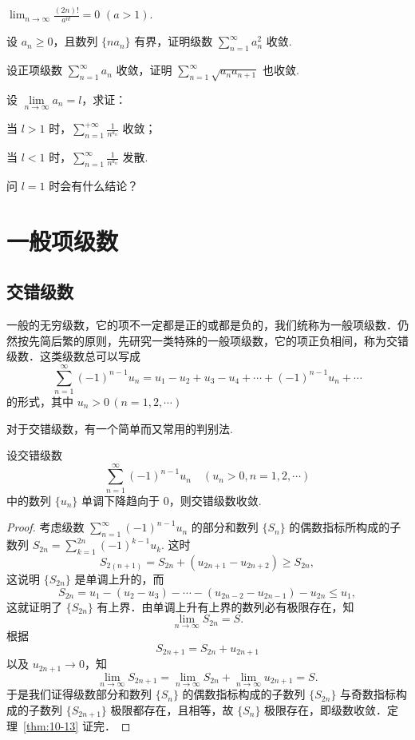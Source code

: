 \begin{xiti}
\begin{ziti}
\item $\displaystyle\lim_{n\to\infty}\frac{(2n)!}{a^{n!}}=0$ $(a>1)$.
\end{ziti}
\item 设 $a_n\geq0$，且数列 $\{na_n\}$ 有界，证明级数 $\displaystyle\sum_{n=1}^{\infty}a_n^2$ 收敛.
\item 设正项级数 $\displaystyle\sum_{n=1}^{\infty}a_{n}$ 收敛，证明 $\sum_{n=1}^{\infty}\sqrt{a_{n}a_{n+1}}$ 也收敛.
\item 设 $\lim\limits_{n\to\infty}a_n=l$，求证：
\begin{ziti}
\item 当 $l>1$ 时，$\displaystyle\sum_{n=1}^{+\infty}\frac{1}{n^{a_{n}}}$ 收敛；
\item 当 $l<1$ 时，$\displaystyle\sum_{n=1}^{\infty}\frac{1}{n^{a_{n}}}$ 发散.
\end{ziti}
问 $l=1$ 时会有什么结论？
\end{xiti}

\section{一般项级数}

\subsection{交错级数}

一般的无穷级数，它的项不一定都是正的或都是负的，我们统称为一般项级数．仍然按先简后繁的原则，先研究一类特殊的一般项级数，它的项正负相间，称为交错级数．这类级数总可以写成
\[
\sum_{n=1}^{\infty}(-1)^{n-1}u_{n}=u_{1}-u_{2}+u_{3}-u_{4}+\cdots+(-1)^{n-1}u_{n}+\cdots
\]
的形式，其中 $u_{n}>0\,(n=1,2,\cdots)$

对于交错级数，有一个简单而又常用的判别法.

\begin{theorem}[莱布尼茨判别法]\label{thm:10-13}
设交错级数
\[
\sum_{n=1}^{\infty}(-1)^{n-1}u_{n}\quad(u_{n}>0,n=1,2,\cdots)
\]
中的数列 $\{u_{n}\}$ 单调下降趋向于 $0$，则交错级数收敛.
\end{theorem}

\begin{proof}
考虑级数 $\sum_{n=1}^{\infty}(-1)^{n-1}u_{n}$ 的部分和数列 $\{S_{n}\}$ 的偶数指标所构成的子数列 $S_{2n}=\sum_{k=1}^{2n}(-1)^{k-1}u_{k}$. 这时
\[
S_{2(n+1)}=S_{2n}+(u_{2n+1}-u_{2n+2})\geqslant S_{2n},
\]
这说明 $\{S_{2n}\}$ 是单调上升的，而
\[
S_{2n}=u_{1}-(u_{2}-u_{3})-\cdots-(u_{2n-2}-u_{2n-1})-u_{2n}\leqslant u_{1},
\]
这就证明了 $\{S_{2n}\}$ 有上界．由单调上升有上界的数列必有极限存在，知
\[
\lim_{n\to\infty}S_{2n}=S.
\]
根据
\[
S_{2n+1}=S_{2n}+u_{2n+1}
\]
以及 $u_{2n+1}\rightarrow0$，知
\[
\lim_{n\to\infty}S_{2n+1}=\lim_{n\to\infty}S_{2n}+\lim_{n\to\infty}u_{2n+1}=S.
\]
于是我们证得级数部分和数列 $\{S_n\}$ 的偶数指标构成的子数列 $\{S_{2n}\}$ 与奇数指标构成的子数列 $\{S_{2n+1}\}$ 极限都存在，且相等，故 $\{S_n\}$ 极限存在，即级数收敛．定理~\ref{thm:10-13} 证完．
\end{proof}

